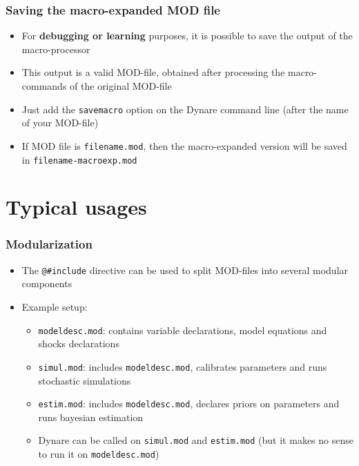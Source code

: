 \documentclass{beamer}
\begin{document}
\begin{frame}
  \frametitle{Saving the macro-expanded MOD file}
  \begin{itemize}
  \item For \textbf{debugging or learning} purposes, it is possible to save the output of the macro-processor
  \item This output is a valid MOD-file, obtained after processing the macro-commands of the original MOD-file
  \item Just add the \texttt{savemacro} option on the Dynare command line (after the name of your MOD-file)
  \item If MOD file is \texttt{filename.mod}, then the macro-expanded version will be saved in \texttt{filename-macroexp.mod}
  \end{itemize}
\end{frame}


\section{Typical usages}

\begin{frame}[fragile=singleslide]
  \frametitle{Modularization}
  \begin{itemize}
  \item The \verb+@#include+ directive can be used to split MOD-files into several modular components
  \item Example setup:
    \begin{itemize}
    \item \texttt{modeldesc.mod}: contains variable declarations, model equations and shocks declarations
    \item \texttt{simul.mod}: includes \texttt{modeldesc.mod}, calibrates parameters and runs stochastic simulations
    \item \texttt{estim.mod}: includes \texttt{modeldesc.mod}, declares priors on parameters and runs bayesian estimation
    \item Dynare can be called on \texttt{simul.mod} and \texttt{estim.mod} (but it makes no sense to run it on \texttt{modeldesc.mod})
    \end{itemize}
  \end{itemize}
\end{frame}
\end{document}
